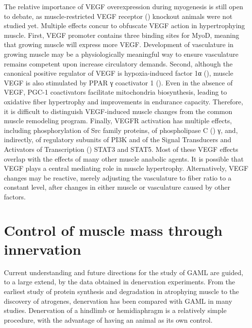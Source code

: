 \documentclass[12pt,english]{report}\usepackage[]{graphicx}\usepackage[]{color}
\begin{document}
The relative importance of VEGF overexpression during myogenesis is
still open to debate, as muscle-restricted VEGF receptor ()
knockout animals were not studied yet. Multiple effects concur to
obfuscate VEGF action in hypertrophying muscle. First, VEGF promoter
contains three binding sites for MyoD, meaning that growing muscle
will express more VEGF\citep{bryan2008coordinated}. Development of
vasculature in growing muscle may be a physiologically meaningful
way to ensure vasculature remains competent upon increase circulatory
demands. Second, although the canonical positive regulator of VEGF
is hypoxia-induced factor 1α (),
muscle VEGF is also stimulated by PPAR γ coactivator 1 ()\citep{vianna2006hypomorphic,rowe2011pgc-1beta}.
Even in the absence of VEGF, PGC-1 coactivators facilitate mitochondria
biosynthesis, leading to oxidative fiber hypertrophy and improvements
in endurance capacity\citep{lin2002transcriptional}. Therefore, it
is difficult to distinguish VEGF-induced muscle changes from the common
muscle remodeling program. Finally, VEGFR activation has multiple
effects, including phosphorylation of Src family proteins\citep{waltenberger1994different},
of phospholipase C () γ\citep{seetharam1995unique},
and, indirectly, of regulatory subunits of PI3K\citep{gerber1998vascular}
and of the Signal Transducers and Activators of Transcription ()
STAT3 and STAT5\citep{korpelainen1999endothelial}. Most of these
VEGF effects overlap with the effects of many other muscle anabolic
agents. It is possible that VEGF plays a central mediating role in
muscle hypertrophy. Alternatively, VEGF changes may be reactive, merely
adjusting the vasculature to fiber ratio to a constant level, after
changes in either muscle or vasculature caused by other factors.


\section{Control of muscle mass through innervation}

Current understanding and future directions for the study of GAML
are guided, to a large extend, by the data obtained in denervation
experiments. From the earliest study of protein synthesis and degradation
in atrophying muscle to the discovery of atrogenes, denervation has
been compared with GAML in many studies. Denervation of a hindlimb
or hemidiaphragm is a relatively simple procedure, with the advantage
of having an animal as its own control. 
\end{document}
